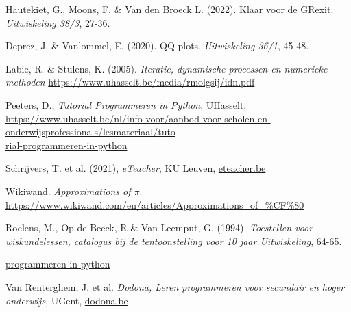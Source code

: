 \begin{bronnen}
    \item Hautekiet, G., Moons, F. \& Van den Broeck L. (2022). Klaar voor de GRexit. \emph{Uitwiskeling 38/3}, 27-36.
    
    \item Deprez, J. \& Vanlommel, E. (2020). QQ-plots. \emph{Uitwiskeling 36/1}, 45-48.
    
    \item Labie, R. \& Stulens, K. (2005). \emph{Iteratie, dynamische processen en numerieke methoden} \url{https://www.uhasselt.be/media/rmolgsij/idn.pdf}

    \item Peeters, D., \emph{Tutorial Programmeren in Python}, UHasselt, \\ \href{https://www.uhasselt.be/nl/info-voor/aanbod-voor-scholen-en-onderwijsprofessionals/lesmateriaal/tutorial-programmeren-in-python}{https://www.uhasselt.be/nl/info-voor/aanbod-voor-scholen-en-onderwijsprofessionals/lesmateriaal/tuto\\rial-programmeren-in-python}

    \item Schrijvers, T. et al. (2021), \emph{eTeacher}, KU Leuven, \url{eteacher.be}
    \item Wikiwand. \emph{Approximations of $\pi$}. \url{https://www.wikiwand.com/en/articles/Approximations_of_%CF%80}

    \item Roelens, M., Op de Beeck, R \& Van Leemput, G. (1994). \emph{Toestellen voor wiskundelessen, catalogus bij de tentoonstelling voor 10 jaar Uitwiskeling}, 64-65.
    
    \url{programmeren-in-python}
    \item Van Renterghem, J. et al. \emph{Dodona, Leren programmeren voor secundair en hoger onderwijs}, UGent, \url{dodona.be}


\end{bronnen}